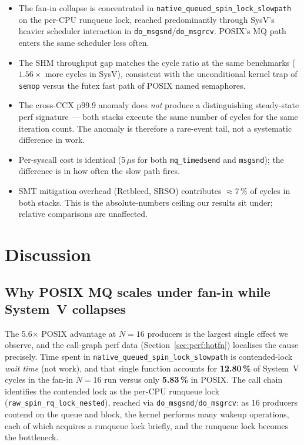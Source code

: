 \documentclass[a4paper,11pt]{article}
\begin{document}
\begin{itemize}[leftmargin=*]
\item The fan-in collapse is concentrated in
\texttt{native\_queued\_spin\_lock\_slowpath} on the per-CPU runqueue
lock, reached predominantly through SysV's heavier scheduler
interaction in \texttt{do\_msgsnd}/\texttt{do\_msgrcv}. POSIX's MQ
path enters the same scheduler less often.
\item The SHM throughput gap matches the cycle ratio at the same
benchmarks ($1.56\times$ more cycles in SysV), consistent with the
unconditional kernel trap of \texttt{semop} versus the futex fast path
of POSIX named semaphores.
\item The cross-CCX p99.9 anomaly does \emph{not} produce a
distinguishing steady-state perf signature --- both stacks execute the
same number of cycles for the same iteration count. The anomaly is
therefore a rare-event tail, not a systematic difference in work.
\item Per-syscall cost is identical (5\,$\mu$s for both
\texttt{mq\_timedsend} and \texttt{msgsnd}); the difference is in
how often the slow path fires.
\item SMT mitigation overhead (Retbleed, SRSO) contributes
$\approx 7\,\%$ of cycles in both stacks. This is the absolute-numbers
ceiling our results sit under; relative comparisons are unaffected.
\end{itemize}

\section{Discussion}
\label{sec:discussion}

\subsection{Why POSIX MQ scales under fan-in while System~V collapses}
\label{sec:disc:fanin}

The 5.6$\times$ POSIX advantage at $N=16$ producers is the largest
single effect we observe, and the call-graph perf data
(Section~\ref{sec:perf:hotfn}) localises the cause precisely. Time
spent in \texttt{native\_queued\_spin\_lock\_slowpath} is contended-lock
\emph{wait time} (not work), and that single function accounts for
\textbf{12.80\,\%} of System~V cycles in the fan-in $N=16$ run versus
only \textbf{5.83\,\%} in POSIX. The call chain identifies the
contended lock as the per-CPU runqueue lock
(\texttt{raw\_spin\_rq\_lock\_nested}), reached via
\texttt{do\_msgsnd}/\texttt{do\_msgrcv}: as 16 producers contend on
the queue and block, the kernel performs many wakeup operations, each
of which acquires a runqueue lock briefly, and the runqueue lock
becomes the bottleneck.
\end{document}
